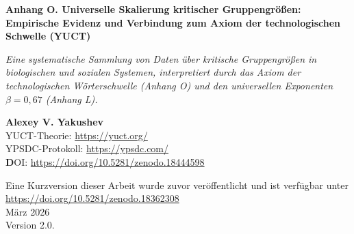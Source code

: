 \documentclass[12pt]{article}
\theoremstyle{remark}
\begin{document}
	
	\begin{titlepage}
		\begin{center}
			\vspace*{0.5cm}
			\Huge\textbf{Anhang O. Universelle Skalierung kritischer Gruppengrößen: \\ Empirische Evidenz und Verbindung zum Axiom der technologischen Schwelle (YUCT)}
			
			\vspace{0.3cm}
			\small\textit{Eine systematische Sammlung von Daten über kritische Gruppengrößen in biologischen und sozialen Systemen, interpretiert durch das Axiom der technologischen Wörterschwelle (Anhang O) und den universellen Exponenten $\beta = 0,67$ (Anhang L).}
			
			\vspace{0.3cm}
			\small\textbf{Alexey V. Yakushev} \\
			YUCT-Theorie: \url{https://yuct.org/}\\
			YPSDC-Protokoll: \url{https://ypsdc.com/}\\
			
			\vspace{2cm}
			\textbf DOI: \url{https://doi.org/10.5281/zenodo.18444598}\\
			
			\vspace{1cm}
			
			\vspace{0cm}
			\large 
			Eine Kurzversion dieser Arbeit wurde zuvor veröffentlicht und ist verfügbar unter\\ \url{https://doi.org/10.5281/zenodo.18362308}\\
			\vspace{1cm}
			März 2026 \\ \large Version 2.0.
			

\end{center}
\end{titlepage}
\end{document}
